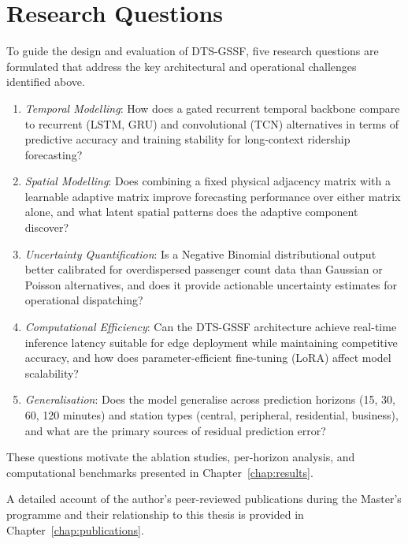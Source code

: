 \section{Research Questions}
\label{sec:rqs}

To guide the design and evaluation of DTS-GSSF, five research questions are formulated that address the key architectural and operational challenges identified above.

\begin{enumerate}
    \item[\textbf{RQ1:}] \textit{Temporal Modelling}: How does a gated recurrent temporal backbone compare to recurrent (LSTM, GRU) and convolutional (TCN) alternatives in terms of predictive accuracy and training stability for long-context ridership forecasting?
    \item[\textbf{RQ2:}] \textit{Spatial Modelling}: Does combining a fixed physical adjacency matrix with a learnable adaptive matrix improve forecasting performance over either matrix alone, and what latent spatial patterns does the adaptive component discover?
    \item[\textbf{RQ3:}] \textit{Uncertainty Quantification}: Is a Negative Binomial distributional output better calibrated for overdispersed passenger count data than Gaussian or Poisson alternatives, and does it provide actionable uncertainty estimates for operational dispatching?
    \item[\textbf{RQ4:}] \textit{Computational Efficiency}: Can the DTS-GSSF architecture achieve real-time inference latency suitable for edge deployment while maintaining competitive accuracy, and how does parameter-efficient fine-tuning (LoRA) affect model scalability?
    \item[\textbf{RQ5:}] \textit{Generalisation}: Does the model generalise across prediction horizons (15, 30, 60, 120 minutes) and station types (central, peripheral, residential, business), and what are the primary sources of residual prediction error?
\end{enumerate}

These questions motivate the ablation studies, per-horizon analysis, and computational benchmarks presented in Chapter~\ref{chap:results}.

A detailed account of the author's peer-reviewed publications during the Master's programme and their relationship to this thesis is provided in Chapter~\ref{chap:publications}.